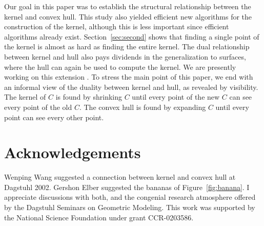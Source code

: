 \documentclass{sig-alternate}
\begin{document}
Our goal in this paper was to establish the structural relationship between
the kernel and convex hull.
This study also yielded efficient new algorithms for the construction
of the kernel, although this is less important since efficient algorithms already exist.
Section~\ref{sec:second} shows that finding a single point of the kernel 
is almost as hard as finding the entire kernel.
The dual relationship between kernel and hull also pays dividends
in the generalization to surfaces, where the hull can again be used
to compute the kernel.
We are presently working on this extension \cite{jj03}.
To stress the main point of this paper, we end with an 
informal view of the duality between kernel and hull, as revealed by visibility.
The kernel of $C$ is found by shrinking $C$ until every point of the new $C$ 
can see every point of the old $C$.
The convex hull is found by expanding $C$ until every point can see every other point.

\section{Acknowledgements}

Wenping Wang suggested a connection between kernel and convex hull at Dagstuhl 2002.
Gershon Elber suggested the bananas of Figure~\ref{fig:banana}.
I appreciate discussions with both, and the congenial research
atmosphere offered by the Dagstuhl Seminars on Geometric Modeling.
This work was supported by the National Science Foundation under 
grant CCR-0203586.

\end{document}
